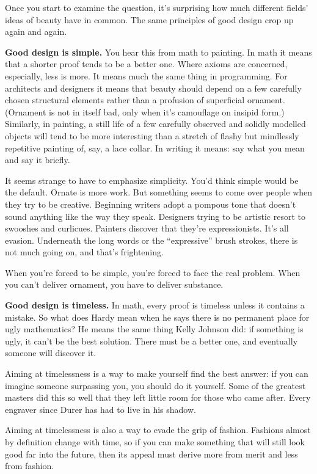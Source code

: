 \documentclass[12pt]{book}
\begin{document}
Once you start to examine the question, it's surprising how much
different fields' ideas of beauty have in common. The same principles of
good design crop up again and again.

\textbf{Good design is simple.} You hear this from math to painting. In
math it means that a shorter proof tends to be a better one. Where
axioms are concerned, especially, less is more. It means much the same
thing in programming. For architects and designers it means that beauty
should depend on a few carefully chosen structural elements rather than
a profusion of superficial ornament. (Ornament is not in itself bad,
only when it's camouflage on insipid form.) Similarly, in painting, a
still life of a few carefully observed and solidly modelled objects will
tend to be more interesting than a stretch of flashy but mindlessly
repetitive painting of, say, a lace collar. In writing it means: say
what you mean and say it briefly.

It seems strange to have to emphasize simplicity. You'd think simple
would be the default. Ornate is more work. But something seems to come
over people when they try to be creative. Beginning writers adopt a
pompous tone that doesn't sound anything like the way they speak.
Designers trying to be artistic resort to swooshes and curlicues.
Painters discover that they're expressionists. It's all evasion.
Underneath the long words or the ``expressive'' brush strokes, there is
not much going on, and that's frightening.

When you're forced to be simple, you're forced to face the real problem.
When you can't deliver ornament, you have to deliver substance.

\textbf{Good design is timeless.} In math, every proof is timeless
unless it contains a mistake. So what does Hardy mean when he says there
is no permanent place for ugly mathematics? He means the same thing
Kelly Johnson did: if something is ugly, it can't be the best solution.
There must be a better one, and eventually someone will discover it.

Aiming at timelessness is a way to make yourself find the best answer:
if you can imagine someone surpassing you, you should do it yourself.
Some of the greatest masters did this so well that they left little room
for those who came after. Every engraver since Durer has had to live in
his shadow.

Aiming at timelessness is also a way to evade the grip of fashion.
Fashions almost by definition change with time, so if you can make
something that will still look good far into the future, then its appeal
must derive more from merit and less from fashion.
\end{document}

